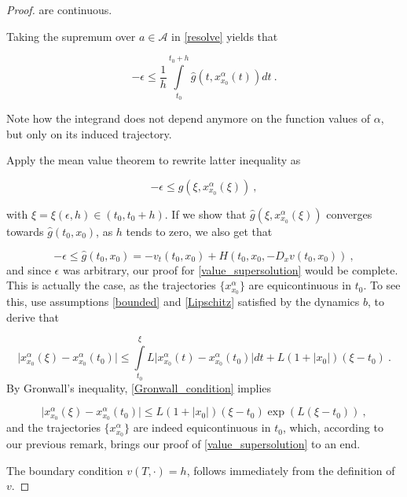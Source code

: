 \begin{theorem}
\begin{proof}
		are continuous.
		
		Taking the supremum over $ a \in \mathcal{A} $ in \ref{resolve} yields that
		
		\begin{equation*}
			- \epsilon \leq \frac{1}{h} \int\limits^{t_0 + h}_{t_0} \hat{g}(t, x^{\alpha}_{x_0}(t)) dt \ .
		\end{equation*}
		
		Note how the integrand does not depend anymore on the function values of $ \alpha $, but only on its induced trajectory.
		
		Apply the mean value theorem to rewrite latter inequality as
		
		\begin{equation*}
			- \epsilon \leq \hat{g}(\xi, x^{\alpha}_{x_0}(\xi)) \ ,
		\end{equation*}
		
		with $ \xi = \xi(\epsilon, h) \in \left( t_0, t_0 + h \right) $. If we show that $ \hat{g}(\xi, x^{\alpha}_{x_0}(\xi)) $ converges towards $ \hat{g}(t_0, x_0) $, as $ h $ tends to zero, we also get that
		
		\begin{equation*}
			-\epsilon \leq \hat{g}(t_0, x_0) = -v_t(t_0, x_0) + H(t_0, x_0, -D_x v(t_0, x_0)) \ ,
		\end{equation*}
		and since $ \epsilon $ was arbitrary, our proof for \ref{value_supersolution} would be complete. This is actually the case, as the trajectories $ \{ x^{\alpha}_{x_0} \} $ are equicontinuous in $ t_0 $. To see this, use assumptions \ref{bounded} and \ref{Lipschitz} satisfied by the dynamics $ b $, to derive that
		
		\begin{equation}
			\label{Gronwall_condition}
			\lvert x^{\alpha}_{x_0} (\xi) - x^{\alpha}_{x_0} (t_0) \rvert \leq \int\limits^{\xi}_{t_0} L \lvert x^{\alpha}_{x_0} (t) - x^{\alpha}_{x_0} (t_0) \rvert dt + L(1 + \lvert x_0 \rvert)(\xi - t_0) \ .
		\end{equation}
		By Gronwall's inequality, \ref{Gronwall_condition} implies
		
		\begin{equation*}
				\lvert x^{\alpha}_{x_0} (\xi) - x^{\alpha}_{x_0} (t_0) \rvert \leq L(1 + \lvert x_0 \rvert)(\xi - t_0) \exp(L(\xi - t_0)) \ ,
		\end{equation*}
		and the trajectories $ \{ x^{\alpha}_{x_0} \} $ are indeed equicontinuous in $ t_0 $, which, according to our previous remark, brings our proof of \ref{value_supersolution} to an end.
		
		The boundary condition $ v(T, \cdot) = h $, follows immediately from the definition of $ v $.
	\end{proof}
\end{theorem}